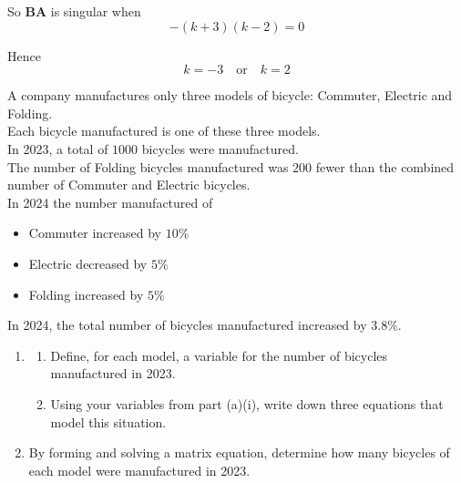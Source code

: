 \documentclass[leqno]{article}
\begin{document}
\begin{enumerate}[
  label=\textbf{\arabic*.},
  leftmargin=*,
  topsep=0pt,
  partopsep=0pt,
  parsep=0pt
]
\begin{djsSolution}
\begin{enumerate}[label=\textbf{(\alph*)}]
  So \(\mathbf{BA}\) is singular when
  \[
  -(k+3)(k-2)=0
  \]

  Hence
  \[
  k=-3 \quad \text{or} \quad k=2
  \]
\end{enumerate}
\end{djsSolution}


\newpage

\questionitem

A company manufactures only three models of bicycle: Commuter, Electric and Folding. \\

Each bicycle manufactured is one of these three models. \\

In 2023, a total of $1000$ bicycles were manufactured. \\

The number of Folding bicycles manufactured was $200$ fewer than the combined number of Commuter and Electric bicycles. \\

In 2024 the number manufactured of
\begin{itemize}
\item Commuter increased by $10\%$
\item Electric decreased by $5\%$
\item Folding increased by $5\%$
\end{itemize}
In 2024, the total number of bicycles manufactured increased by $3.8\%$. \\

\begin{enumerate}[label=\textbf{(\alph*)}]
  \item
  \begin{enumerate}[label=(\roman*)]
    \item Define, for each model, a variable for the number of bicycles manufactured in 2023. 
    \item Using your variables from part (a)(i), write down three equations that model this situation. 
  \end{enumerate}
  \item By forming and solving a matrix equation, determine how many bicycles of each model were manufactured in 2023.  \\
\end{enumerate}

\vspace*{10pt}


\end{enumerate}
\end{document}
